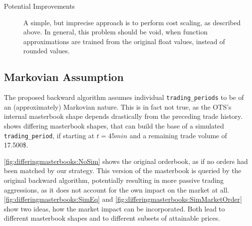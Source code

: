 \begin{description}
\item[Potential Improvements]  A simple, but imprecise approach is to perform cost scaling, as described above. In general, this problem should be void, when function approximations are trained from the original float values, instead of rounded values.
\end{description}


\subsection{Markovian Assumption}
\label{chap:backwardalgorithm:discussion:markovianassumption}
The proposed backward algorithm assumes individual \lstinline!trading_periods! to be of an (approximately) Markovian nature. This is in fact not true, as the \ac{OTS}'s internal masterbook shape depends drastically from the preceding trade history.\\

 shows differing masterbook shapes, that can build the base of a simulated \lstinline!trading_period!, \eg if starting at $t=45min$ and a remaining trade volume of 17.500\$.

\ref{fig:differingmasterbooks:NoSim} shows the original orderbook, as if no orders had been matched by our strategy. This version of the masterbook is queried by the original backward algorithm, potentially resulting in more passive trading aggressions, as it does not account for the own impact on the market at all. \ref{fig:differingmasterbooks:SimEq} and \ref{fig:differingmasterbooks:SimMarketOrder} show two ideas, how the market impact can be incorporated. Both lead to different masterbook shapes and to different subsets of attainable prices.\\

